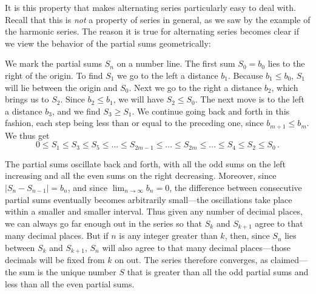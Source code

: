 {{{{\medskip
\noindent
\begin{center}
\end{center}
\medskip

It is this property that makes alternating series particularly easy to deal
 with. Recall that this is {\em not} a property of series in general, as we saw by the example of the harmonic series.  The reason it is true for alternating series becomes clear if we view the behavior of the partial sums geometrically:  

\vspace*{2in}

We mark the partial sums $S_n$  on a number line.  The first sum $S_0=b_0$ lies to the right of the origin.  To find $S_1$ we go to the left a distance $b_1$.  Because $b_1 \leq b_0$, $S_1$ will lie between the origin and $S_0$.  Next we go to the right a distance $b_2$, which brings us to $S_2$.  Since $b_2 \leq b_1$, we will have $S_2 \leq S_0$.  The next move is to the left a distance $b_3$, and we find $S_3 \geq S_1$.  We continue going back and forth in this fashion, each step being less than or equal to the preceding one, since $b_{m+1} \leq b_m$.  We thus get
\[
0\leq S_1 \leq S_3 \leq S_5 \leq \ldots \leq S_{2m-1} \leq \ldots \leq S_{2m} \leq \ldots \leq S_4 \leq S_2 \leq S_0 \, .
\]

The partial sums oscillate back and forth, 
with all the odd sums on the left increasing and all the even sums on the right decreasing. Moreover, since $|S_{n}-S_{n-1}| = b_n$, and since $\lim_{n \to \infty} b_n = 0$, the difference between consecutive partial sums eventually becomes arbitrarily small---the oscillations take place within a smaller and smaller interval.  Thus given any number of decimal places, we can always go far enough out in the series so that $S_k$ and $S_{k+1}$ agree to that many decimal places. But if $n$ is any integer greater than $k$, then, since $S_n$ lies between $S_k$ and $S_{k+1}$, $S_n$ will also agree to that many decimal places---those decimals will be fixed from $k$ on out.  The series therefore converges, as claimed---the sum is the unique number $S$ that is greater than all the odd partial sums and less than all the even partial sums.

}}}}
